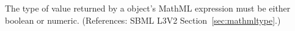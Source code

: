 The type of value returned by a \FunctionDefinition object's 
MathML expression must be either boolean or numeric.  (References: SBML
L3V2 Section~\ref{sec:mathmltype}.)
